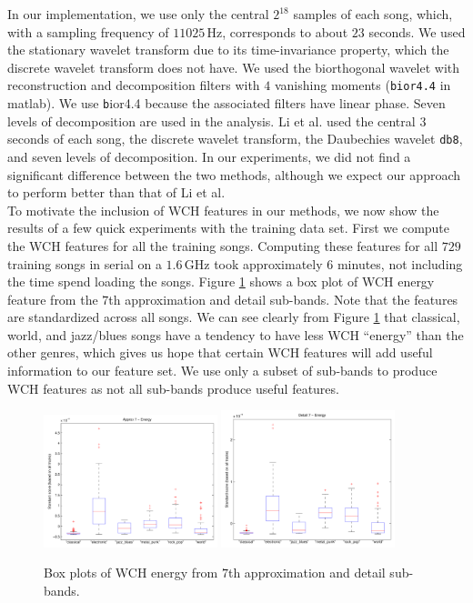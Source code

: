 \documentclass[12pt]{article}
\begin{document}
In our implementation, we use only the central $2^{18}$ samples of each song, which, with a sampling frequency of $11025\,\text{Hz}$, corresponds to about $23$ seconds.  We used the stationary wavelet transform due to its time-invariance property, which the discrete wavelet transform does not have.  We used the biorthogonal wavelet with reconstruction and decomposition filters with $4$ vanishing moments (\texttt{bior4.4} in {\sc matlab}).  We use {\texttt bior4.4} because the associated filters have linear phase.  Seven levels of decomposition are used in the analysis.  Li et al. used the central $3$ seconds of each song, the discrete wavelet transform, the Daubechies wavelet \texttt{db8}, and seven levels of decomposition.  In our experiments, we did not find a significant difference between the two methods, although we expect our approach to perform better than that of Li et al.\\

To motivate the inclusion of WCH features in our methods, we now show the results of a few quick experiments with the training data set.  First we compute the WCH features for all the training songs.  Computing these features for all $729$ training songs in serial on a $1.6\,\text{GHz}$ took approximately $6$ minutes, not including the time spend loading the songs.  Figure \ref{fig:wch_box} shows a box plot of WCH energy feature from the $7$th approximation and detail sub-bands.  Note that the features are standardized across all songs.  We can see clearly from Figure \ref{fig:wch_box} that classical, world, and jazz/blues songs have a tendency to have less WCH ``energy'' than the other genres, which gives us hope that certain WCH features will add useful information to our feature set.  We use only a subset of sub-bands to produce WCH features as not all sub-bands produce useful features.

\begin{figure}[h!]
   \centering
   \includegraphics[width=0.45\textwidth]{figures/wch_box_08.pdf}
   \includegraphics[width=0.45\textwidth]{figures/wch_box_16.pdf}
   \caption{Box plots of WCH energy from $7$th approximation and detail sub-bands.}
   \label{fig:wch_box}
\end{figure}
\end{document}
